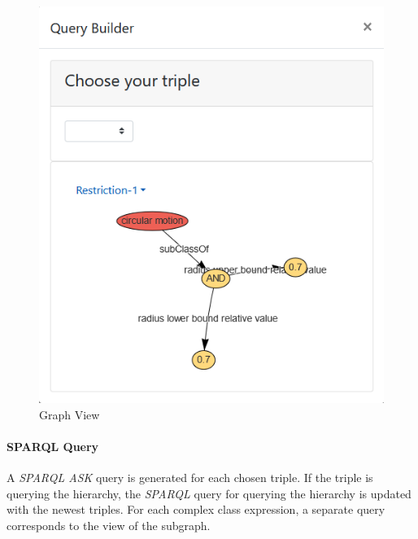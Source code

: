 \begin{figure}[H]
    \includegraphics[scale=0.5]{Graphics/OwlVisualizer/queryBuilder4.png}
    \centering
    \caption{Graph View}
\end{figure}

\paragraph{SPARQL Query}
A \textit{SPARQL ASK} query is generated for each chosen triple. If the triple is querying the hierarchy, the \textit{SPARQL} query for querying the hierarchy is updated with the newest triples.
For each complex class expression, a separate query corresponds to the view of the subgraph.


